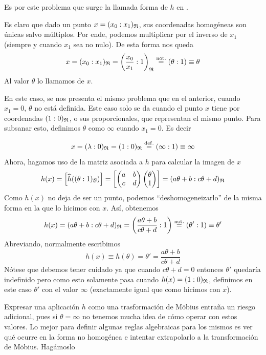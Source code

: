 Es por este problema que surge la llamada forma de $h$ en .

Es claro que dado un punto $x=(x_0:x_1)_{\mathfrak{R}}$, sus coordenadas homogéneas son únicas salvo múltiplos. Por ende, podemos multiplicar por el inverso de $x_1$ (siempre y cuando $x_1$ sea no nulo). De esta forma nos queda
\[x=(x_0:x_1)_{\mathfrak{R}}=\left(\frac{x_0}{x_1}:1\right)_{\mathfrak{R}}\stackrel{\mathrm{not.}}{=}(\theta:1)\equiv\theta\]
Al valor $\theta$ lo llamamos  de $x$.

En este caso, se nos presenta el mismo problema que en el anterior, cuando $x_1=0$, $\theta$ no está definida. Este caso solo se da cuando el punto $x$ tiene por coordenadas $(1:0)_{\mathfrak{R}}$, o sus proporcionales, que representan el mismo punto. Para subsanar esto, definimos $\theta$ como $\infty$ cuando $x_1=0$. Es decir

\[x=(\lambda:0)_{\mathfrak{R}}=(1:0)_{\mathfrak{R}}\stackrel{\mathrm{def.}}{=}(\infty:1)\equiv\infty\]
Ahora, hagamos uso de la matriz asociada a $h$ para calcular la imagen de $x$
\[h(x)=\left [ \widehat{h}((\theta:1)_{\mathcal{B}}) \right ]=\left [ \begin{pmatrix}
	a & b\\
	c & d
	\end{pmatrix}\begin{pmatrix}
	\theta\\
	1
	\end{pmatrix} \right ]=(a\theta+b:c\theta+d)_{\mathfrak{R}}\]
Como $h(x)$ no deja de ser un punto, podemos ``deshomogeneizarlo'' de la misma forma en la que lo hicimos con $x$. Así, obtenemos
\[h(x)=(a\theta+b:c\theta+d)_{\mathfrak{R}}=\left(\frac{a\theta+b}{c\theta+d}:1\right)\stackrel{\mathrm{not.}}{=}(\theta':1)\equiv\theta'\]
Abreviando, normalmente escribimos
\begin{equation}
	h(x)\equiv h(\theta)=\theta'=\frac{a\theta+b}{c\theta+d}
\end{equation}
Nótese que debemos tener cuidado ya que cuando $c\theta+d=0$ entonces $\theta'$ quedaría indefinido pero como esto solamente pasa cuando $h(x)=(1:0)_{\mathfrak{R}}$, definimos en este caso $\theta'$ con el valor $\infty$ (exactamente igual que como hicimos con $x$).

Expresar una aplicación $h$ como una trasformación de Möbius entraña un riesgo adicional, pues si $\theta=\infty$ no tenemos mucha idea de cómo operar con estos valores. Lo mejor para definir algunas reglas algebraicas para los mismos es ver qué ocurre en la forma no homogénea e intentar extrapolarlo a la transformación de Möbius. Hagámoslo

